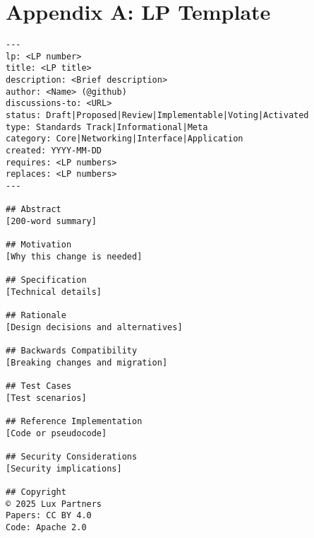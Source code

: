 \documentclass[11pt,a4paper]{article}
\begin{document}
\section*{Appendix A: LP Template}

\begin{verbatim}
---
lp: <LP number>
title: <LP title>
description: <Brief description>
author: <Name> (@github)
discussions-to: <URL>
status: Draft|Proposed|Review|Implementable|Voting|Activated
type: Standards Track|Informational|Meta
category: Core|Networking|Interface|Application
created: YYYY-MM-DD
requires: <LP numbers>
replaces: <LP numbers>
---

## Abstract
[200-word summary]

## Motivation
[Why this change is needed]

## Specification
[Technical details]

## Rationale
[Design decisions and alternatives]

## Backwards Compatibility
[Breaking changes and migration]

## Test Cases
[Test scenarios]

## Reference Implementation
[Code or pseudocode]

## Security Considerations
[Security implications]

## Copyright
© 2025 Lux Partners
Papers: CC BY 4.0
Code: Apache 2.0
\end{verbatim}
\end{document}
